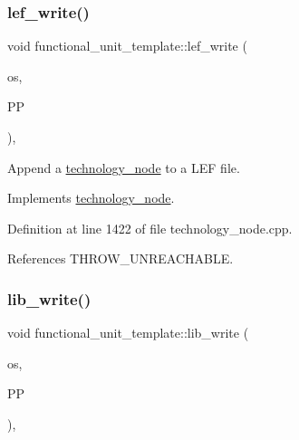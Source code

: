 \subsubsection{\texorpdfstring{lef\+\_\+write()}{lef\_write()}}
{\footnotesize\ttfamily void functional\+\_\+unit\+\_\+template\+::lef\+\_\+write (\begin{DoxyParamCaption}\item[{std\+::ofstream \&}]{os,  }\item[{const \hyperlink{simple__indent_8hpp_ad85cff64e49d5dbf5cefe96f411c720e}{simple\+\_\+indent\+Ref}}]{PP }\end{DoxyParamCaption})\hspace{0.3cm}{\ttfamily [override]}, {\ttfamily [virtual]}}



Append a \hyperlink{structtechnology__node}{technology\+\_\+node} to a L\+EF file. 



Implements \hyperlink{structtechnology__node_a2a92a701dec7c32a6bee6f66576f1fc6}{technology\+\_\+node}.



Definition at line 1422 of file technology\+\_\+node.\+cpp.



References T\+H\+R\+O\+W\+\_\+\+U\+N\+R\+E\+A\+C\+H\+A\+B\+LE.

\mbox{\label{structfunctional__unit__template_a1b4e1554138137039ed3048a042e5543}} 
\subsubsection{\texorpdfstring{lib\+\_\+write()}{lib\_write()}}
{\footnotesize\ttfamily void functional\+\_\+unit\+\_\+template\+::lib\+\_\+write (\begin{DoxyParamCaption}\item[{std\+::ofstream \&}]{os,  }\item[{const \hyperlink{simple__indent_8hpp_ad85cff64e49d5dbf5cefe96f411c720e}{simple\+\_\+indent\+Ref}}]{PP }\end{DoxyParamCaption})\hspace{0.3cm}{\ttfamily [override]}, {\ttfamily [virtual]}}



